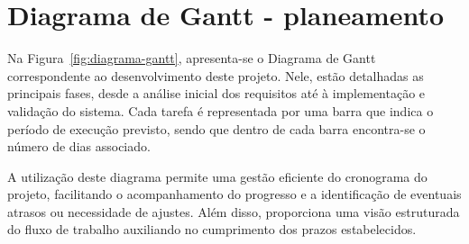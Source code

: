 
\section{Diagrama de Gantt - planeamento}
\label{capitulo3:Diagrama-gantt}

Na Figura~\ref{fig:diagrama-gantt}, apresenta-se o Diagrama de Gantt correspondente ao desenvolvimento deste projeto. Nele, estão detalhadas as principais fases, desde a análise inicial dos requisitos até à implementação e validação do sistema. Cada tarefa é representada por uma barra que indica o período de execução previsto, sendo que dentro de cada barra encontra-se o número de dias associado.

A utilização deste diagrama permite uma gestão eficiente do cronograma do projeto, facilitando o acompanhamento do progresso e a identificação de eventuais atrasos ou necessidade de ajustes. Além disso, proporciona uma visão estruturada do fluxo de trabalho auxiliando no cumprimento dos prazos estabelecidos.

